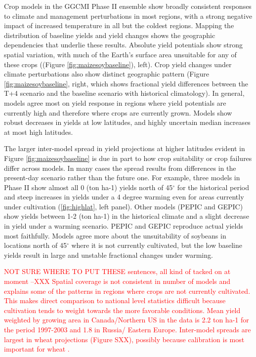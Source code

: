 \documentclass[gmd, manuscript]{copernicus} %
\begin{document}
Crop models in the GGCMI Phase II ensemble show broadly consistent responses to climate and management perturbations in most regions, with a strong negative impact of increased temperature in all but the coldest regions. 
Mapping the distribution of baseline yields and yield changes shows the geographic dependencies that underlie these results. 
Absolute yield potentials show strong spatial variation, with much of the Earth's surface area unsuitable for any of these crops ((Figure \ref{fig:maizesoybaseline}), left).
Crop yield changes under climate perturbations also show distinct geographic pattern (Figure \ref{fig:maizesoybaseline}, right, which shows fractional yield differences between the T+4 scenario and the baseline scenario with historical climatology).
In general, models agree most on yield response in regions where yield potentials are currently high and therefore where crops are currently grown. 
Models show robust decreases in yields at low latitudes, and highly uncertain median increases at most high latitudes.

The larger inter-model spread in yield projections at higher latitudes evident in Figure \ref{fig:maizesoybaseline} is due in part to how crop suitability or crop failures differ across models. 
In many cases the spread results from differences in the present-day scenario rather than the future one. 
For example, three models in Phase II show almost all 0 (ton ha-1) yields north of 45$^\circ$ for the historical period and steep increases in yields under a 4 degree warming even for areas currently under cultivation (\ref{fig:highlat}, left panel). 
Other models (PEPIC and GEPIC) show yields between 1-2 (ton ha-1) in the historical climate and a slight decrease in yield under a warming scenario.
PEPIC and GEPIC reproduce actual yields \citep{Ray2012} most faithfully.
Models agree more about the unsuitability of soybeans in locations north of 45$^\circ$ where it is not currently cultivated, but the low baseline yields result in large and unstable fractional changes under warming.

\textcolor{red}{NOT SURE WHERE TO PUT THESE sentences, all kind of tacked on at moment --XXX 
Spatial coverage is not consistent in number of models and explains some of the patterns in regions where crops are not currently cultivated.
This makes direct comparison to national level statistics difficult because cultivation tends to weight towards the more favorable conditions.
Mean yield weighted by growing area in Canada/Northern US in the \cite{Ray2012} data is 2.2 ton ha-1 for the period 1997-2003 and 1.8 in Russia/ Eastern Europe.
Inter-model spreads are largest in wheat projections (Figure SXX), possibly because calibration is most important for wheat \citep[e.g.][]{Asseng2013}.}
\end{document}
